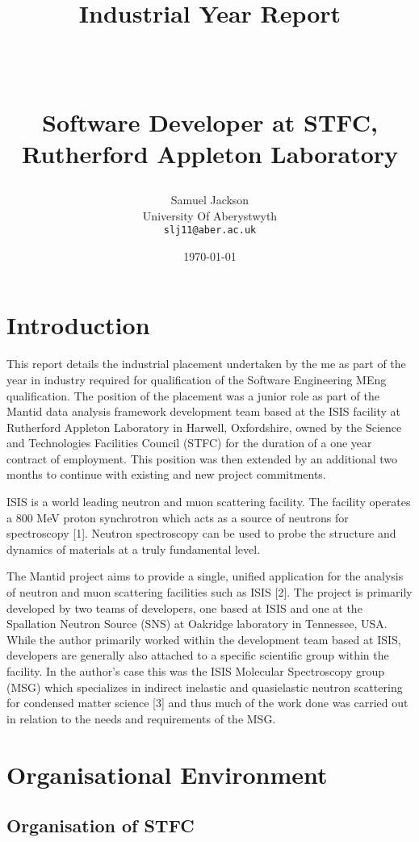 \documentclass[paper=a4, fontsize=11pt]{scrartcl}	%
\title{
	\vspace{-1in} 	\usefont{OT1}{bch}{b}{n}
	\huge \strut Industrial Year Report \strut \\
	\Large \bfseries \strut Software Developer at STFC, Rutherford Appleton Laboratory \strut
}
\author{
	\usefont{OT1}{bch}{m}{n} Samuel Jackson
	\\ \usefont{OT1}{bch}{m}{n} University Of Aberystwyth
	\\   \texttt{slj11@aber.ac.uk}
}
\date{\today}
\numberwithin{equation}{section}															%
\numberwithin{figure}{section}																%
\numberwithin{table}{section}
\begin{document}
	\maketitle
	\clearpage
	\tableofcontents
	\clearpage
	\section{Introduction}\label{introduction}

This report details the industrial placement undertaken by the me as
part of the year in industry required for qualification of the Software
Engineering MEng qualification. The position of the placement was a
junior role as part of the Mantid data analysis framework development
team based at the ISIS facility at Rutherford Appleton Laboratory in
Harwell, Oxfordshire, owned by the Science and Technologies Facilities
Council (STFC) for the duration of a one year contract of employment.
This position was then extended by an additional two months to continue
with existing and new project commitments.

ISIS is a world leading neutron and muon scattering facility. The
facility operates a 800 MeV proton synchrotron which acts as a source of
neutrons for spectroscopy {[}1{]}. Neutron spectroscopy can be used to
probe the structure and dynamics of materials at a truly fundamental
level.

The Mantid project aims to provide a single, unified application for the
analysis of neutron and muon scattering facilities such as ISIS {[}2{]}.
The project is primarily developed by two teams of developers, one based
at ISIS and one at the Spallation Neutron Source (SNS) at Oakridge
laboratory in Tennessee, USA. While the author primarily worked within
the development team based at ISIS, developers are generally also
attached to a specific scientific group within the facility. In the
author's case this was the ISIS Molecular Spectroscopy group (MSG) which
specializes in indirect inelastic and quasielastic neutron scattering
for condensed matter science {[}3{]} and thus much of the work done was
carried out in relation to the needs and requirements of the MSG.

\section{Organisational Environment}\label{organisational-environment}

\subsection{Organisation of STFC}\label{organisation-of-stfc}
\end{document}
